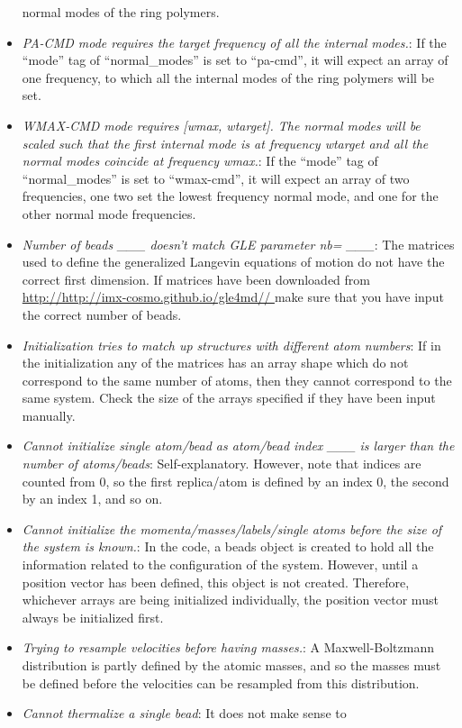 \documentclass[11pt,english,fleqn]{report}
\begin{document}
\begin{itemize}
normal modes of the ring polymers. 
\item \emph{PA-CMD mode requires the target frequency of all the internal modes.}:
If the {}``mode'' tag of {}``normal\_modes'' is set to {}``pa-cmd'',
it will expect an array of one frequency, to which all the internal
modes of the ring polymers will be set. 
\item \emph{WMAX-CMD mode requires [wmax, wtarget]. The normal modes will be scaled such that the first internal mode is at frequency wtarget and all the normal modes coincide at frequency wmax.}:
If the {}``mode'' tag of {}``normal\_modes'' is set to {}``wmax-cmd'',
it will expect an array of two frequencies, one two set the lowest
frequency normal mode, and one for the other normal mode frequencies.
\item \emph{Number of beads \_\_\_ doesn't match GLE parameter nb= \_\_\_}:
The matrices used to define the generalized Langevin equations of
motion do not have the correct first dimension. If matrices have been
downloaded from \url{http://http://imx-cosmo.github.io/gle4md// } make sure that you
have input the correct number of beads.
\item \emph{Initialization tries to match up structures with different atom numbers}:
If in the initialization any of the matrices has an array shape which
do not correspond to the same number of atoms, then they cannot correspond
to the same system. Check the size of the arrays specified if they
have been input manually.
\item \emph{Cannot initialize single atom/bead as atom/bead index \_\_\_ is larger than the number of atoms/beads}:
Self-explanatory. However, note that indices are counted from 0, so
the first replica/atom is defined by an index 0, the second by an
index 1, and so on.
\item \emph{Cannot initialize the momenta/masses/labels/single atoms before the size of the system is known.}:
In the code, a beads object is created to hold all the information
related to the configuration of the system. However, until a position
vector has been defined, this object is not created. Therefore, whichever
arrays are being initialized individually, the position vector must
always be initialized first.
\item \emph{Trying to resample velocities before having masses.}: A Maxwell-Boltzmann
distribution is partly defined by the atomic masses, and so the masses
must be defined before the velocities can be resampled from this distribution.
\item \emph{Cannot thermalize a single bead}: It does not make sense to

\end{itemize}
\end{document}
